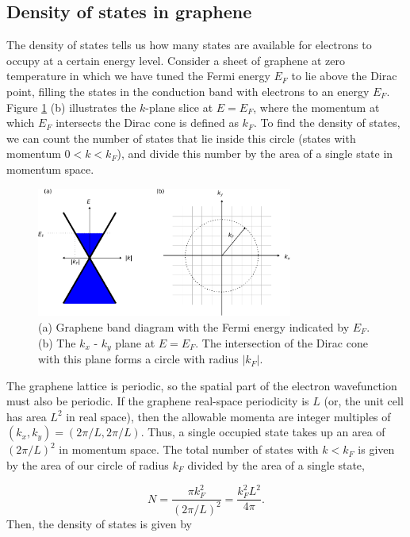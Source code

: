 \documentclass[double,12pt,1in,seploa]{beavtex}
\let\Oldsubsection\subsection
\renewcommand{\subsection}{\FloatBarrier\Oldsubsection}
\begin{document}
\subsection{Density of states in graphene}
The density of states tells us how many states are available for electrons to occupy at a certain energy level. Consider a sheet of graphene at zero temperature in which we have tuned the Fermi energy $E_F$ to lie above the Dirac point, filling the states in the conduction band with electrons to an energy $E_F$. Figure \ref{density of states graphic} (b) illustrates the $k$-plane slice at $E = E_F$, where the momentum at which $E_F$ intersects the Dirac cone is defined as $k_F$. To find the density of states, we can count the number of states that lie inside this circle (states with momentum $0 < k < k_F$), and divide this number by the area of a single state in momentum space.

\begin{figure}
    \includegraphics[width = 0.75\textwidth]{density of states graphic.pdf}
    \caption{(a) Graphene band diagram with the Fermi energy indicated by $E_F$. (b) The $k_x$ - $k_y$ plane at $E = E_F$. The intersection of the Dirac cone with this plane forms a circle with radius $|k_F|$.}
    \label{density of states graphic}
\end{figure}
The graphene lattice is periodic, so the spatial part of the electron wavefunction must also be periodic. If the graphene real-space periodicity is $L$ (or, the unit cell has area $L^2$ in real space), then the allowable momenta are integer multiples of $(k_x, k_y) = (2\pi/L, 2\pi/L)$. Thus, a single occupied state takes up an area of $(2\pi/L)^2$ in momentum space. The total number of states with $k < k_F$ is given by the area of our circle of radius $k_F$ divided by the area of a single state,

\begin{equation}
    N = \frac{\pi k_F^2}{(2\pi/L)^2} = \frac{k_F^2 L^2}{4\pi}. 
\end{equation}
Then, the density of states is given by 
\end{document}
